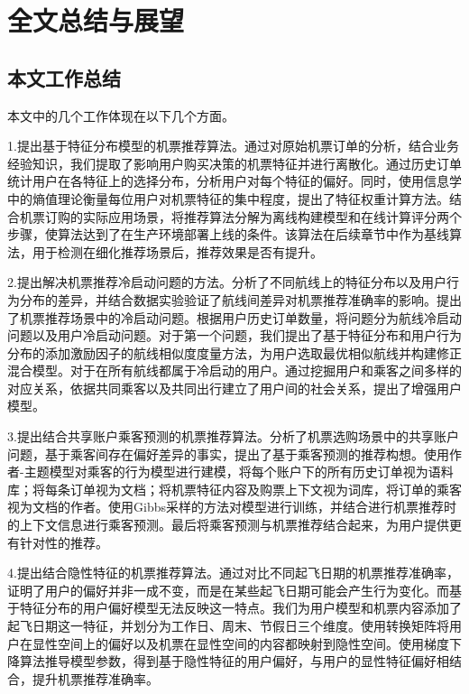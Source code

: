 
\chapter{全文总结与展望}
\label{chap:summary}

\section{本文工作总结}
本文中的几个工作体现在以下几个方面。

1.提出基于特征分布模型的机票推荐算法。通过对原始机票订单的分析，结合业务经验知识，我们提取了影响用户购买决策的机票特征并进行离散化。通过历史订单统计用户在各特征上的选择分布，分析用户对每个特征的偏好。同时，使用信息学中的熵值理论衡量每位用户对机票特征的集中程度，提出了特征权重计算方法。结合机票订购的实际应用场景，将推荐算法分解为离线构建模型和在线计算评分两个步骤，使算法达到了在生产环境部署上线的条件。该算法在后续章节中作为基线算法，用于检测在细化推荐场景后，推荐效果是否有提升。

2.提出解决机票推荐冷启动问题的方法。分析了不同航线上的特征分布以及用户行为分布的差异，并结合数据实验验证了航线间差异对机票推荐准确率的影响。提出了机票推荐场景中的冷启动问题。根据用户历史订单数量，将问题分为航线冷启动问题以及用户冷启动问题。对于第一个问题，我们提出了基于特征分布和用户行为分布的添加激励因子的航线相似度度量方法，为用户选取最优相似航线并构建修正混合模型。对于在所有航线都属于冷启动的用户。通过挖掘用户和乘客之间多样的对应关系，依据共同乘客以及共同出行建立了用户间的社会关系，提出了增强用户模型。

3.提出结合共享账户乘客预测的机票推荐算法。分析了机票选购场景中的共享账户问题，基于乘客间存在偏好差异的事实，提出了基于乘客预测的推荐构想。使用作者-主题模型对乘客的行为模型进行建模，将每个账户下的所有历史订单视为语料库；将每条订单视为文档；将机票特征内容及购票上下文视为词库，将订单的乘客视为文档的作者。使用Gibbs采样的方法对模型进行训练，并结合进行机票推荐时的上下文信息进行乘客预测。最后将乘客预测与机票推荐结合起来，为用户提供更有针对性的推荐。

4.提出结合隐性特征的机票推荐算法。通过对比不同起飞日期的机票推荐准确率，证明了用户的偏好并非一成不变，而是在某些起飞日期可能会产生行为变化。而基于特征分布的用户偏好模型无法反映这一特点。我们为用户模型和机票内容添加了起飞日期这一特征，并划分为工作日、周末、节假日三个维度。使用转换矩阵将用户在显性空间上的偏好以及机票在显性空间的内容都映射到隐性空间。使用梯度下降算法推导模型参数，得到基于隐性特征的用户偏好，与用户的显性特征偏好相结合，提升机票推荐准确率。

